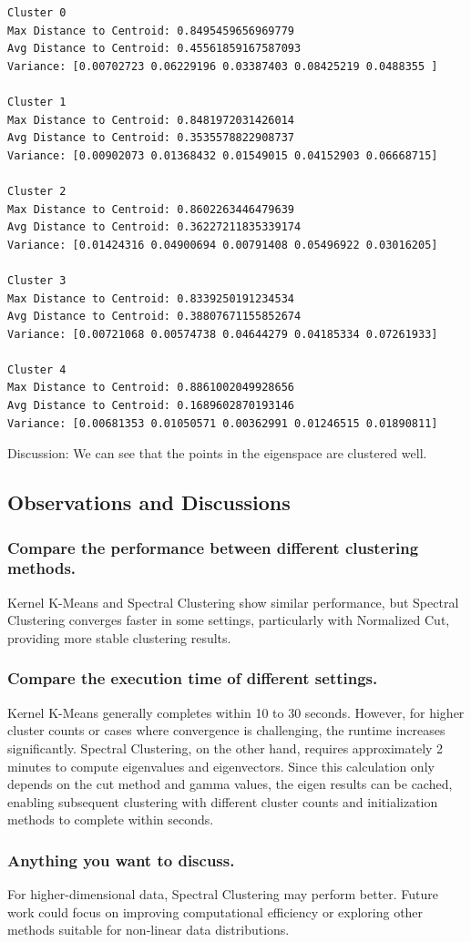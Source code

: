 \documentclass{homework}
\begin{document}
\begin{lstlisting}
Cluster 0
Max Distance to Centroid: 0.8495459656969779
Avg Distance to Centroid: 0.45561859167587093
Variance: [0.00702723 0.06229196 0.03387403 0.08425219 0.0488355 ]

Cluster 1
Max Distance to Centroid: 0.8481972031426014
Avg Distance to Centroid: 0.3535578822908737
Variance: [0.00902073 0.01368432 0.01549015 0.04152903 0.06668715]

Cluster 2
Max Distance to Centroid: 0.8602263446479639
Avg Distance to Centroid: 0.36227211835339174
Variance: [0.01424316 0.04900694 0.00791408 0.05496922 0.03016205]

Cluster 3
Max Distance to Centroid: 0.8339250191234534
Avg Distance to Centroid: 0.38807671155852674
Variance: [0.00721068 0.00574738 0.04644279 0.04185334 0.07261933]

Cluster 4
Max Distance to Centroid: 0.8861002049928656
Avg Distance to Centroid: 0.1689602870193146
Variance: [0.00681353 0.01050571 0.00362991 0.01246515 0.01890811]
\end{lstlisting}

Discussion: We can see that the points in the eigenspace are clustered well.

\subsection{Observations and Discussions}

\subsubsection{Compare the performance between different clustering methods.}

Kernel K-Means and Spectral Clustering show similar performance, but Spectral Clustering converges faster in some settings, particularly with Normalized Cut, providing more stable clustering results.

\subsubsection{Compare the execution time of different settings.}

Kernel K-Means generally completes within 10 to 30 seconds. However, for higher cluster counts or cases where convergence is challenging, the runtime increases significantly. Spectral Clustering, on the other hand, requires approximately 2 minutes to compute eigenvalues and eigenvectors. Since this calculation only depends on the cut method and gamma values, the eigen results can be cached, enabling subsequent clustering with different cluster counts and initialization methods to complete within seconds.

\subsubsection{Anything you want to discuss.}

For higher-dimensional data, Spectral Clustering may perform better. Future work could focus on improving computational efficiency or exploring other methods suitable for non-linear data distributions.
\end{document}
